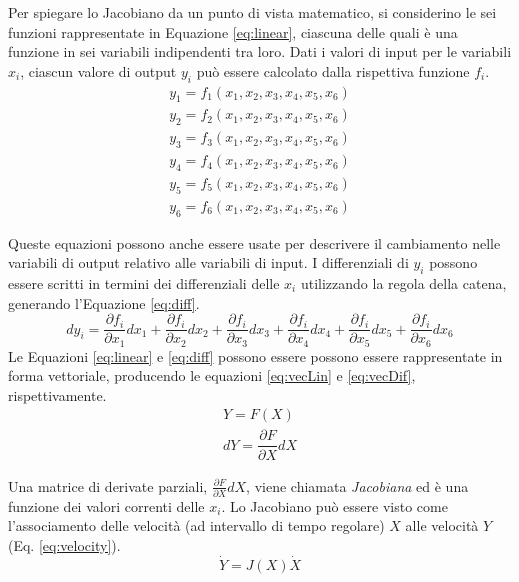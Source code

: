 Per spiegare lo Jacobiano da un punto di vista matematico, si considerino le sei funzioni rappresentate in Equazione \ref{eq:linear}, ciascuna delle quali è una funzione in sei variabili indipendenti tra loro.
Dati i valori di input per le variabili $x_i$, ciascun valore di output $y_i$ può essere calcolato dalla rispettiva funzione $f_i$.
\begin{equation} \label{eq:linear}
    \begin{aligned}
        y_1 = f_1(x_1,x_2,x_3,x_4,x_5,x_6)\\
        y_2 = f_2(x_1,x_2,x_3,x_4,x_5,x_6)\\
        y_3 = f_3(x_1,x_2,x_3,x_4,x_5,x_6)\\
        y_4 = f_4(x_1,x_2,x_3,x_4,x_5,x_6)\\
        y_5 = f_5(x_1,x_2,x_3,x_4,x_5,x_6)\\
        y_6 = f_6(x_1,x_2,x_3,x_4,x_5,x_6)
    \end{aligned}
\end{equation}

Queste equazioni possono anche essere usate per descrivere il cambiamento nelle variabili di output relativo alle variabili di input.
I differenziali di $y_i$ possono essere scritti in termini dei differenziali delle $x_i$ utilizzando la regola della catena, generando l'Equazione \ref{eq:diff}.
\begin{equation}\label{eq:diff}
    dy_i = \dfrac{\partial f_i}{\partial x_1}dx_1+
        \dfrac{\partial f_i}{\partial x_2}dx_2+
        \dfrac{\partial f_i}{\partial x_3}dx_3+
        \dfrac{\partial f_i}{\partial x_4}dx_4+
        \dfrac{\partial f_i}{\partial x_5}dx_5+
        \dfrac{\partial f_i}{\partial x_6}dx_6
\end{equation}
Le Equazioni \ref{eq:linear} e \ref{eq:diff} possono essere possono essere rappresentate in forma vettoriale, producendo le equazioni \ref{eq:vecLin} e \ref{eq:vecDif}, rispettivamente.
\begin{align}
    \label{eq:vecLin}
    Y =  F(X)\\[5ex]
    \label{eq:vecDif}
    dY =  \dfrac{\partial F}{\partial X}dX
\end{align}

Una matrice di derivate parziali, $\frac{\partial F}{\partial X}dX$, viene chiamata \emph{Jacobiana} ed è una funzione dei valori correnti delle $x_i$. Lo Jacobiano può essere visto come l'associamento delle velocità (ad intervallo di tempo regolare) $X$ alle velocità $Y$ (Eq. \ref{eq:velocity}).
\begin{equation}\label{eq:velocity}
    \dot{Y} = J(X)\dot{X}
\end{equation}

